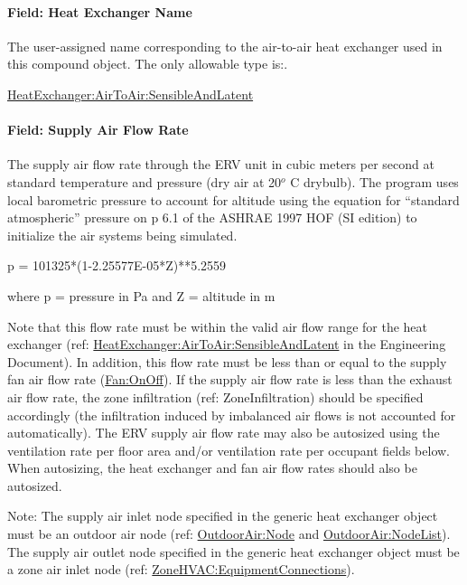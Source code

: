 \paragraph{Field: Heat Exchanger Name}\label{field-heat-exchanger-name-002}

The user-assigned name corresponding to the air-to-air heat exchanger used in this compound object. The only allowable type is:.

\hyperref[heatexchangerairtoairsensibleandlatent]{HeatExchanger:AirToAir:SensibleAndLatent}

\paragraph{Field: Supply Air Flow Rate}\label{field-supply-air-flow-rate-000}

The supply air flow rate through the ERV unit in cubic meters per second at standard temperature and pressure (dry air at 20\(^{o}\) C drybulb). The program uses local barometric pressure to account for altitude using the equation for ``standard atmospheric'' pressure on p 6.1 of the ASHRAE 1997 HOF (SI edition) to initialize the air systems being simulated.

p = 101325*(1-2.25577E-05*Z)**5.2559

where p = pressure in Pa and Z = altitude in m

Note that this flow rate must be within the valid air flow range for the heat exchanger (ref: \hyperref[heatexchangerairtoairsensibleandlatent]{HeatExchanger:AirToAir:SensibleAndLatent} in the Engineering Document). In addition, this flow rate must be less than or equal to the supply fan air flow rate (\hyperref[fanonoff]{Fan:OnOff}). If the supply air flow rate is less than the exhaust air flow rate, the zone infiltration (ref: ZoneInfiltration) should be specified accordingly (the infiltration induced by imbalanced air flows is not accounted for automatically). The ERV supply air flow rate may also be autosized using the ventilation rate per floor area and/or ventilation rate per occupant fields below. When autosizing, the heat exchanger and fan air flow rates should also be autosized.

Note: The supply air inlet node specified in the generic heat exchanger object must be an outdoor air node (ref: \hyperref[outdoorairnode]{OutdoorAir:Node} and \hyperref[outdoorairnodelist]{OutdoorAir:NodeList}). The supply air outlet node specified in the generic heat exchanger object must be a zone air inlet node (ref: \hyperref[zonehvacequipmentconnections]{ZoneHVAC:EquipmentConnections}).

